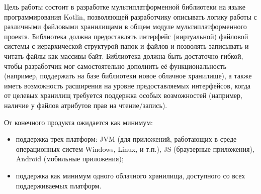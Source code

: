 
Цель работы состоит в разработке мультиплатформенной библиотеки на языке программирования Kotlin, позволяющей разработчику описывать логику работы с различными файловыми хранилищами в общем модуле мультиплатформенного проекта. Библиотека должна предоставлять интерфейс (виртуальной) файловой системы с иерархической структурой папок и файлов и позволять записывать и читать файлы как массивы байт. Библиотека должна быть достаточно гибкой, чтобы разработчик мог самостоятельно дополнить её функциональность (например, поддержать на базе библиотеки новое облачное хранилище), а также иметь возможность расширения на уровне предоставляемых интерфейсов, когда от целевых хранилищ требуется поддержка особых возможностей (например, наличие у файлов атрибутов прав на чтение/запись). 

От конечного продукта ожидается как минимум:
\begin{itemize}
    \item поддержка трех платформ: JVM (для приложений, работающих в среде операционных систем Windows, Linux, и т.п.), JS (браузерные приложения), Android (мобильные приложения);
    \item поддержка как минимум одного облачного хранилища, доступного со всех поддерживаемых платформ.
\end{itemize}


